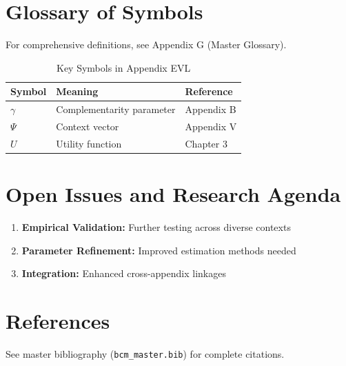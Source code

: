 \section{Glossary of Symbols}
\label{sec:evl-glossary}

For comprehensive definitions, see Appendix G (Master Glossary).

\begin{table}[htbp]
\centering
\caption{Key Symbols in Appendix EVL}
\begin{tabular}{lll}
\toprule
\textbf{Symbol} & \textbf{Meaning} & \textbf{Reference} \\
\midrule
$\gamma$ & Complementarity parameter & Appendix B \\
$\Psi$ & Context vector & Appendix V \\
$U$ & Utility function & Chapter 3 \\
\bottomrule
\end{tabular}
\end{table}



\section{Open Issues and Research Agenda}
\label{sec:evl-open}

\begin{enumerate}
    \item \textbf{Empirical Validation:} Further testing across diverse contexts
    \item \textbf{Parameter Refinement:} Improved estimation methods needed
    \item \textbf{Integration:} Enhanced cross-appendix linkages
\end{enumerate}

\section{References}
\label{sec:evl-references}

See master bibliography (\texttt{bcm\_master.bib}) for complete citations.

\nocite{bcm_master}

